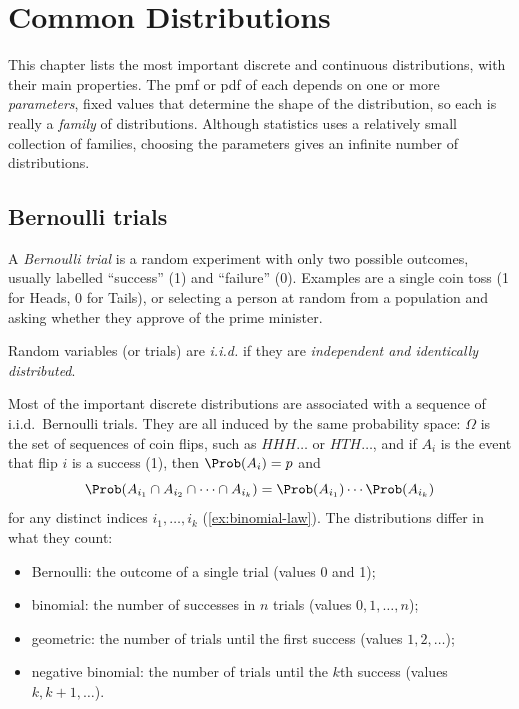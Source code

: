\chapter{Common Distributions}\label{ch:common-distributions}



This chapter lists the most important discrete and continuous distributions, with their main properties. The pmf or pdf of each depends on one or more \emph{parameters}, fixed values that determine the shape of the distribution, so each is really a \emph{family} of distributions. Although statistics uses a relatively small collection of families, choosing the parameters gives an infinite number of distributions.

\section{Bernoulli trials}\label{sec:bernoulli-trials}

A \emph{Bernoulli trial} is a random experiment with only two possible outcomes, usually labelled ``success'' (1) and ``failure'' (0). Examples are a single coin toss (1 for Heads, 0 for Tails), or selecting a person at random from a population and asking whether they approve of the prime minister.

\begin{definition}[i.i.d.]\label{def:iid}
Random variables (or trials) are \emph{i.i.d.} if they are \emph{independent and identically distributed}.
\end{definition}

Most of the important discrete distributions are associated with a sequence of i.i.d.\ Bernoulli trials. They are all induced by the same probability space: $\Omega$ is the set of sequences of coin flips, such as $HHH\ldots$ or $HTH\ldots$, and if $A_i$ is the event that flip $i$ is a success (1), then $\Prob(A_i) = p$ and
\[
  \Prob(A_{i_1} \cap A_{i_2} \cap \cdots \cap A_{i_k}) = \Prob(A_{i_1}) \cdots \Prob(A_{i_k})
\]
for any distinct indices $i_1, \ldots, i_k$ (\cref{ex:binomial-law}). The distributions differ in what they count:
\begin{itemize}
  \item Bernoulli: the outcome of a single trial (values 0 and 1);
  \item binomial: the number of successes in $n$ trials (values $0, 1, \ldots, n$);
  \item geometric: the number of trials until the first success (values $1, 2, \ldots$);
  \item negative binomial: the number of trials until the $k$th success (values $k, k+1, \ldots$).
\end{itemize}

